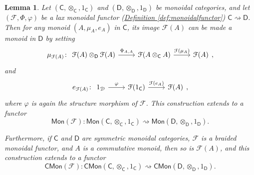 \documentclass[a4paper,10pt]{scrreprt}
\theoremstyle{definition}
\theoremstyle{plain}
\newtheorem{lemma}{Lemma}[section]
\theoremstyle{remark}
\begin{document}
\begin{lemma}
  \label{lemma:monoidalfunctorspreserveinternalmonoids}
  Let $(\mathsf{C}, \otimes_{\mathsf{C}}, 1_{\mathsf{C}})$ and $(\mathsf{D}, \otimes_{\mathsf{D}}, 1_{\mathsf{D}})$ be monoidal categories, and let $(\mathcal{F}, \Phi, \varphi)$ be a lax monoidal functor (\hyperref[def:monoidalfunctor]{Definition \ref*{def:monoidalfunctor}}) $\mathsf{C} \rightsquigarrow \mathsf{D}$. Then for any monoid $(A, \mu_{A}, e_{A})$ in $\mathsf{C}$, its image $\mathcal{F}(A)$ can be made a monoid in $\mathsf{D}$ by setting
  \begin{equation*}
    \mu_{\mathcal{F}(A)}\colon 
    \begin{tikzcd}
      \mathcal{F}(A) \otimes_{\mathsf{D}} \mathcal{F}(A) 
      \arrow[r, "{\Phi_{A, A}}"]
      & \mathcal{F}(A \otimes_{\mathsf{C}} A) 
      \arrow[r, "\mathcal{F}(\mu_{A})"]
      & \mathcal{F}(A)
    \end{tikzcd},
  \end{equation*}
  and
  \begin{equation*}
    e_{\mathcal{F}(A)}\colon
    \begin{tikzcd}
      1_{\mathcal{D}}
      \arrow[r, "\varphi"]
      & \mathcal{F}(1_{\mathsf{C}})
      \arrow[r, "\mathcal{F}(e_{A})"]
      & \mathcal{F}(A)
    \end{tikzcd},
  \end{equation*}
  where $\varphi$ is again the structure morphism of $\mathcal{F}$. This construction extends to a functor 
  \begin{equation*}
    \mathsf{Mon}(\mathcal{F})\colon \mathsf{Mon}(\mathsf{C}, \otimes_{\mathsf{C}}, 1_{\mathsf{C}}) \rightsquigarrow \mathsf{Mon}(\mathsf{D}, \otimes_{\mathsf{D}}, 1_{\mathsf{D}}).
  \end{equation*}

  Furthermore, if $\mathsf{C}$ and $\mathsf{D}$ are symmetric monoidal categories, $\mathcal{F}$ is a braided monoidal functor, and $A$ is a commutative monoid, then so is $\mathcal{F}(A)$, and this construction extends to a functor
  \begin{equation*}
    \mathsf{CMon}(\mathcal{F})\colon \mathsf{CMon}(\mathsf{C}, \otimes_{\mathsf{C}}, 1_{\mathsf{C}}) \rightsquigarrow \mathsf{CMon}(\mathsf{D}, \otimes_{\mathsf{D}}, 1_{\mathsf{D}}). 
  \end{equation*}
\end{lemma} 
\end{document}
